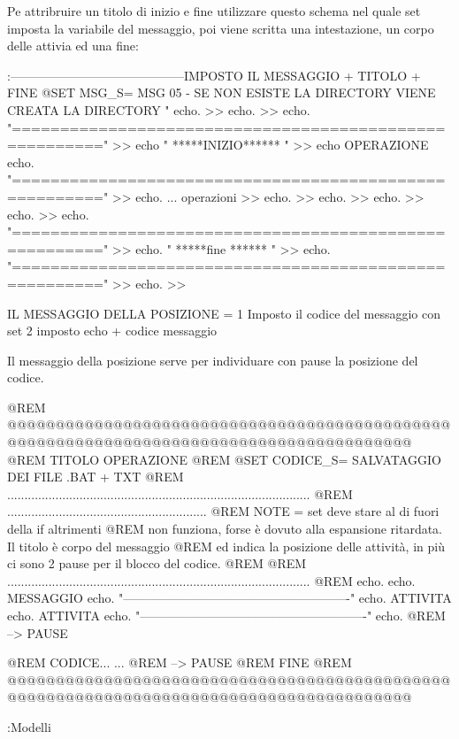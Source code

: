\documentclass[10pt,a4paper]{book}
\begin{document}
{			Pe attribruire un titolo di inizio e fine utilizzare questo schema nel quale
			set imposta la variabile del messaggio, poi viene scritta una intestazione, un corpo
			delle attivia ed una fine:
			
			:------------------------------------------IMPOSTO IL MESSAGGIO + TITOLO + FINE
			@SET MSG_S= MSG 05 - SE NON ESISTE LA DIRECTORY  VIENE CREATA LA DIRECTORY "%
			echo.										>> %
			echo.										>> %
			echo. "======================================================="			>> %
			echo  " 		*****INIZIO****** 		      "			>> %
			echo   OPERAZIONE %
			echo. "======================================================="			>> %
			echo. ... operazioni								>> %
			echo.										>> %
			echo.										>> %
			echo.										>> %
			echo.										>> %
			echo. "======================================================="			>> %
			echo. "                  *****fine ******                     "			>> %
			echo. "======================================================="			>> %
			echo.										>> %
			
			
			
			
			
			
			
			
			IL MESSAGGIO DELLA POSIZIONE = 	1 Imposto il codice del messaggio con set
			2 imposto echo + codice messaggio
			
			Il messaggio della posizione serve per individuare con pause la posizione del codice.				
			
			@REM @@@@@@@@@@@@@@@@@@@@@@@@@@@@@@@@@@@@@@@@@@@@@@@@@@@@@@@@@@@@@@@@@@@@@@@@@@@@@@@@@@@@@@@@
			@REM 				TITOLO OPERAZIONE
			@REM
			@SET CODICE_S= SALVATAGGIO DEI FILE .BAT + TXT
			@REM ........................................................................................
			@REM ..........................................................
			@REM NOTE = set deve stare al di fuori della if altrimenti 
			@REM non funziona, forse è dovuto alla espansione ritardata. Il titolo è corpo del messaggio
			@REM ed indica la posizione delle attività, in più ci sono 2 pause per il blocco del codice.	
			@REM
			@REM ........................................................................................
			@REM
			echo.
			echo. MESSAGGIO %
			echo. "-------------------------------------------------------"	
			echo.	ATTIVITA									
			echo.	ATTIVITA									
			echo. "-------------------------------------------------------"	
			echo.										
			@REM --> PAUSE
			
			@REM CODICE...
			...			
			@REM --> PAUSE
			@REM			FINE
			@REM @@@@@@@@@@@@@@@@@@@@@@@@@@@@@@@@@@@@@@@@@@@@@@@@@@@@@@@@@@@@@@@@@@@@@@@@@@@@@@@@@@@@@@@@
			
			
			
			
			:Modelli
			
		
		}
		
\end{document}
